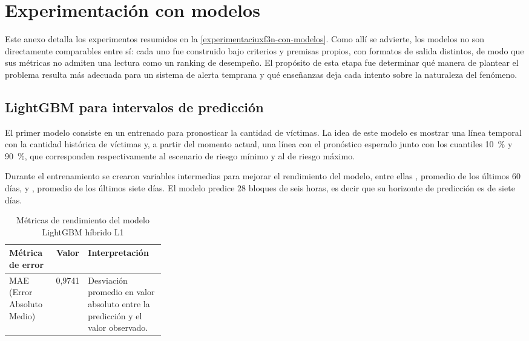 \chapter{Experimentación con modelos}\label{ap:experimentos}

Este anexo detalla los experimentos resumidos en la \cref{experimentaciuxf3n-con-modelos}. Como allí se advierte, los modelos no son directamente comparables entre sí: cada uno fue construido bajo criterios y premisas propios, con formatos de salida distintos, de modo que sus métricas no admiten una lectura como un ranking de desempeño. El propósito de esta etapa fue determinar qué manera de plantear el problema resulta más adecuada para un sistema de alerta temprana y qué enseñanzas deja cada intento sobre la naturaleza del fenómeno.

\section{LightGBM para intervalos de predicción}\label{lightgbm-para-intervalos-de-predicciuxf3n.}

El primer modelo consiste en un \lightgbm{} entrenado para pronosticar la cantidad de víctimas. La idea de este modelo es mostrar una línea temporal con la cantidad histórica de víctimas y, a partir del momento actual, una línea con el pronóstico esperado junto con los cuantiles \qty{10}{\percent} y \qty{90}{\percent}, que corresponden respectivamente al escenario de riesgo mínimo y al de riesgo máximo.

Durante el entrenamiento se crearon variables intermedias para mejorar el rendimiento del modelo, entre ellas , promedio de los últimos 60 días, y , promedio de los últimos siete días. El modelo predice 28 bloques de seis horas, es decir que su horizonte de predicción es de siete días.

\begin{table}[htbp]
\centering
\caption{Métricas de rendimiento del modelo LightGBM híbrido L1}
\label{tab:metricas-de-rendimiento-del-modelo-final}
\begin{tabularx}{\linewidth}{@{}>{\raggedright\arraybackslash}p{0.30\linewidth}c>{\raggedright\arraybackslash}X@{}}
\toprule
\textbf{Métrica de error} & \textbf{Valor} & \textbf{Interpretación} \\
\midrule
MAE (Error Absoluto Medio) & 0,9741 & Desviación promedio en valor absoluto entre la predicción y el valor observado. \\
\bottomrule
\end{tabularx}
\end{table}

